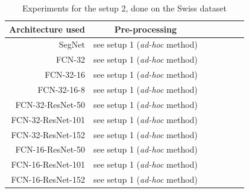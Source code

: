 \begin{table}[ht!]
  \centering
  
  \begin{tabular}{rcccccc}
  \rowcolor{gray!50}
  \toprule
  \textbf{Architecture used} & \textbf{Pre-processing} \\
  \midrule
  SegNet    & see setup 1 (\textit{ad-hoc} method) \\
  FCN-32    & see setup 1 (\textit{ad-hoc} method) \\
  FCN-32-16    & see setup 1 (\textit{ad-hoc} method) \\
  FCN-32-16-8    & see setup 1 (\textit{ad-hoc} method) \\
  FCN-32-ResNet-50    & see setup 1 (\textit{ad-hoc} method) \\
  FCN-32-ResNet-101    & see setup 1 (\textit{ad-hoc} method) \\
  FCN-32-ResNet-152    & see setup 1 (\textit{ad-hoc} method) \\
  FCN-16-ResNet-50    & see setup 1 (\textit{ad-hoc} method) \\
  FCN-16-ResNet-101    & see setup 1 (\textit{ad-hoc} method) \\
  FCN-16-ResNet-152    & see setup 1 (\textit{ad-hoc} method) \\
  \bottomrule
  \end{tabular}%
  \caption{Experiments for the setup 2, done on the Swiss dataset}
  \label{part3:setup2}
\end{table}%


